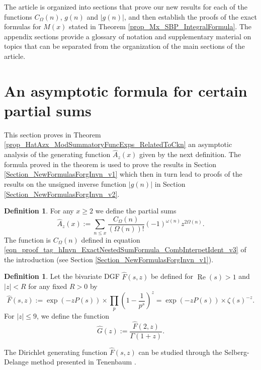 \documentclass[11pt,reqno,a4letter]{article}
\newcommand{\hlocalref}[1]{\hyperref[#1]{\ref{#1}}}
\numberwithin{equation}{section}
\numberwithin{figure}{section}
\numberwithin{table}{section}
\theoremstyle{plain}
\numberwithin{theorem}{section}
\theoremstyle{definition}
\newtheorem{definition}[theorem]{Definition}
\renewcommand{\Re}{\operatorname{Re}}
\begin{document}
The article is organized into sections that prove our new results for each of the functions 
$C_{\Omega}(n)$, $g(n)$ and $|g(n)|$, and then establish the proofs of the 
exact formulas for $M(x)$ stated in 
Theorem \hlocalref{prop_Mx_SBP_IntegralFormula}. 
The appendix sections provide a glossary of notation and 
supplementary material on topics that can be separated from the 
organization of the main sections of the article. 

\section{An asymptotic formula for certain partial sums}

This section proves in 
Theorem \hlocalref{prop_HatAzx_ModSummatoryFuncExps_RelatedToCkn} 
an asymptotic analysis of the generating function $\widehat{A}_z(x)$ 
given by the next definition. The formula proved in the theorem is 
used to prove the results in 
Section \hlocalref{Section_NewFormulasForgInvn_v1} which then in turn 
lead to proofs of the results on the unsigned inverse function $|g(n)|$ in 
Section \hlocalref{Section_NewFormulasForgInvn_v2}. 

\begin{definition}
\label{def_PartialSumsOfCvlFunc_HatAzx_v1} 
For any $x \geq 2$ we define the partial sums 
\[
\widehat{A}_z(x) := \sum_{n \leq x}  
	\frac{C_{\Omega}(n)}{(\Omega(n))!} (-1)^{\omega(n)} z^{2\Omega(n)}. 
\]
The function is $C_{\Omega}(n)$ defined in equation 
\eqref{eqn_proof_tag_hInvn_ExactNestedSumFormula_CombInterpetIdent_v3} 
of the introduction (see 
Section \hlocalref{Section_NewFormulasForgInvn_v1}). 
\end{definition}

\begin{definition}
\label{def_BivariateDGF_HatFsz_AndRelatedFuncs_v1}
Let the bivariate DGF $\widehat{F}(s, z)$ be defined 
for $\Re(s) > 1$ and $|z| < R$ for any fixed $R > 0$ by 
\[
\widehat{F}(s, z) := \exp\left(-z P(s)\right) 
     \times \prod_p \left(1 - \frac{1}{p^s}\right)^{z} = 
     \exp\left(-z P(s)\right) \times \zeta(s)^{-z}. 
\]
For $|z| \leq 9$, we define the function 
\[
\widehat{G}(z) := \frac{\widehat{F}(2, z)}{\Gamma(1+z)}.
\]
\end{definition}

The Dirichlet generating function $\widehat{F}(s, z)$ can be studied through the 
Selberg-Delange method presented in Tenenbaum \cite[\S II.6.1]{TENENBAUM-PROBNUMT-METHODS}. 
\end{document}
